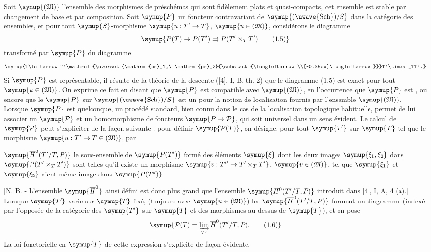 Soit $\symup{(\mathfrak M)}$ l'ensemble des morphismes de préschémas qui sont
\uline{fidèlement plats et quasi-compacts}, cet ensemble est stable par
changement de base et par composition. Soit $\symup{P}$ un foncteur contravariant de
$\symup{(\text{\uwave{Sch}})/S}$ dans la catégorie des ensembles, et pour tout
$\symup{S}$-morphisme $\symup{u:T'\to T}$, $\symup{u\in(\mathfrak M)}$, considérons le
diagramme
\begin{equation}
\symup{P(T)\to P(T')\rightrightarrows P(T'\times_TT')
\tag{1.5}}
\end{equation}
transformé par $\symup{P}$ du diagramme
\[
\symup{T\leftarrow T'\mathrel{\overset{\mathrm{pr}_1,\ \mathrm{pr}_2}{\substack{\longleftarrow\\[-0.35ex]\longleftarrow}}}T'\times_TT'.}
\]
Si $\symup{P}$ est représentable, il résulte de la théorie de la descente ([4], I, B,
th. 2) que le diagramme (1.5) est exact pour tout $\symup{u\in(\mathfrak M)}$. On exprime
ce fait en disant que $\symup{P}$ est compatible avec $\symup{(\mathfrak M)}$, en l'occurrence
que $\symup{P}$ est , ou encore que le
 $\symup{P}$ sur $\symup{(\text{\uwave{Sch}})/S}$ est un  pour la notion
de localisation fournie par l'ensemble $\symup{(\mathfrak M)}$. Lorsque $\symup{P}$ est
quelconque, un procédé standard, bien connu dans le cas de la localisation
topologique habituelle, permet de lui associer un  $\symup{\mathcal P}$ et
un homomorphisme de foncteurs $\symup{P\to\mathcal P}$, qui soit universel
dans un sens évident. Le calcul de $\symup{\mathcal P}$ peut s'expliciter de la façon
suivante : pour définir $\symup{\mathcal P(T)}$, on désigne, pour tout $\symup{T'}$ sur $\symup{T}$ tel
que le morphisme $\symup{u:T'\to T\in(\mathfrak M)}$, par

$\symup{\overline H^0(T'/T,P)}$ le sous-ensemble de $\symup{P(T')}$ formé des éléments $\symup{\xi}$
dont les deux images $\symup{\xi_1,\xi_2}$ dans $\symup{P(T'\times_TT')}$ sont telles qu'il
existe un morphisme $\symup{v:T''\to T'\times_TT'}$, $\symup{v\in(\mathfrak M)}$,
tel que $\symup{\xi_1}$ et $\symup{\xi_2}$ aient même image dans $\symup{P(T'')}$.

[N. B. - L'ensemble
$\symup{\overline H^0}$ ainsi défini est donc plus grand que l'ensemble
$\symup{H^0(T'/T,P)}$ introduit dans [4], I, A, 4 (a).] Lorsque $\symup{T'}$ varie sur $\symup{T}$ fixé,
(toujours avec $\symup{u\in(\mathfrak M)}$) les $\symup{\overline H^0(T'/T,P)}$ forment un
diagramme (indexé par l'opposée de la catégorie des $\symup{T'}$ sur $\symup{T}$ et des
morphismes au-dessus de $\symup{T}$), et on pose
\begin{equation}
\symup{\mathcal P(T)=\varinjlim\limits_{T'}\overline H^0(T'/T,P).
\tag{1.6}}
\end{equation}
La loi fonctorielle en $\symup{T}$ de cette expression s'explicite de façon évidente.

